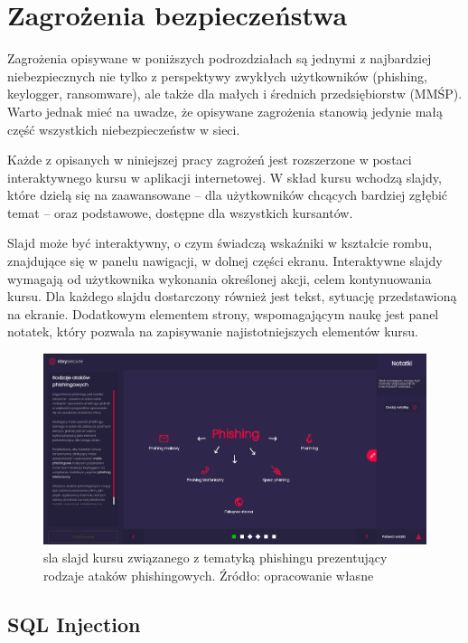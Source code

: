 \documentclass[12pt,twoside]{article}
\begin{document}
\clearpage
\section{Zagrożenia bezpieczeństwa}

Zagrożenia opisywane w poniższych podrozdziałach są jednymi z najbardziej niebezpiecznych nie tylko z perspektywy zwykłych użytkowników (phishing, keylogger, ransomware), ale także dla małych i średnich przedsiębiorstw (MMŚP). Warto jednak mieć na uwadze, że opisywane zagrożenia stanowią jedynie małą część wszystkich niebezpieczeństw w sieci.

Każde z opisanych w niniejszej pracy zagrożeń jest rozszerzone w postaci interaktywnego kursu w aplikacji internetowej. W skład kursu wchodzą slajdy, które dzielą się na zaawansowane -- dla użytkowników chcących bardziej zgłębić temat -- oraz podstawowe, dostępne dla wszystkich kursantów. 

Slajd może być interaktywny, o czym świadczą wskaźniki w kształcie rombu, znajdujące się w panelu nawigacji, w dolnej części ekranu. Interaktywne slajdy wymagają od użytkownika wykonania określonej akcji, celem kontynuowania kursu. Dla każdego slajdu dostarczony również jest tekst, sytuację przedstawioną na ekranie. Dodatkowym elementem strony, wspomagającym naukę jest panel notatek, który pozwala na zapisywanie najistotniejszych elementów kursu.

\begin{figure}[H]
	\centering
	\includegraphics[width=1\linewidth]{figures/slide-tutorial}
	\caption{ sla slajd kursu związanego z tematyką phishingu prezentujący rodzaje ataków phishingowych. Źródło: opracowanie własne}
\end{figure}

\clearpage
\subsection{SQL Injection}
\end{document}
